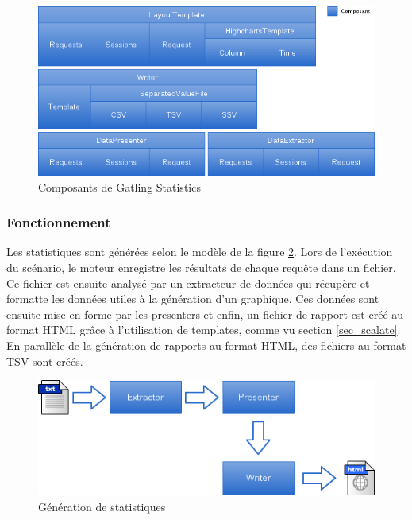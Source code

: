 \begin{figure}[h]
\begin{center}
\includegraphics[width=400pt]{img/gatling_stats.png}
\end{center}
\caption{Composants de Gatling Statistics}
\label{gatling_stats}
\end{figure}

\subsubsection{Fonctionnement}
Les statistiques sont générées selon le modèle de la figure \ref{stats_gen}. Lors de l'exécution du scénario, le moteur enregistre les résultats de chaque requête dans un fichier. Ce fichier est ensuite analysé par un extracteur de données qui récupère et formatte les données utiles à la génération d'un graphique. Ces données sont ensuite mise en forme par les presenters et enfin, un fichier de rapport est créé au format HTML grâce à l'utilisation de templates, comme vu section \ref{sec_scalate}. En parallèle de la génération de rapports au format HTML, des fichiers au format TSV sont créés.

\begin{figure}[h]
\begin{center}
\includegraphics{img/stats_gen.png}
\end{center}
\caption{Génération de statistiques}
\label{stats_gen}
\end{figure}

